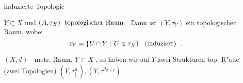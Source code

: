 \documentclass[class=article, crop=false]{standalone}
\begin{document}
\begin{zettel}{induzierte Topologie}
\begin{flashcard}
    $Y \subset X$ und $(A,\tau_X)  \tx{ topologischer Raum }$ 
    Dann ist $(Y,\tau_Y)$ ein topologischer Raum, wobei
    \[
        \tau_Y = \set{U \cap Y}{U \in  \tau _X} \tx{ (induziert) } 
    .\]
\end{flashcard}

\begin{remark}
    $(X,d)$ - metr. Raum, $Y \subset X$ , so haben wir auf $Y$ zwei Strukturen top. R"aue (zwei Topologien) $(Y,\tau^d_{|_Y}), (Y, \tau^{d_{|Y \times Y}})$ 
\end{remark}
\end{zettel}
\end{document}
